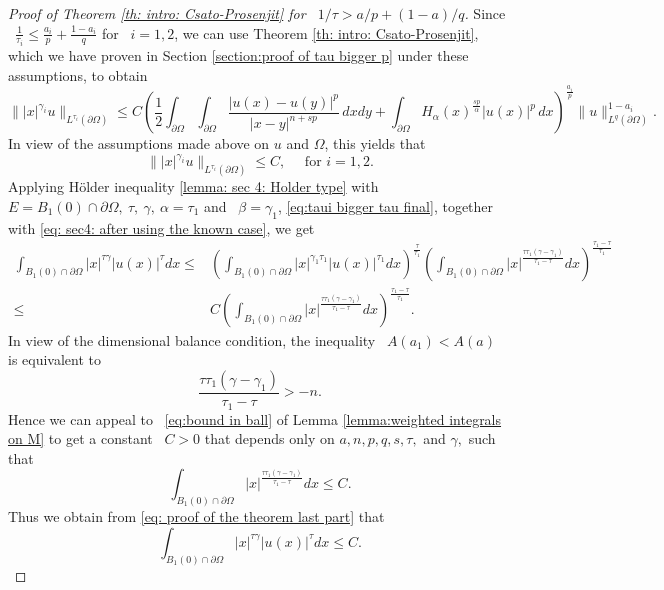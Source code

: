 \documentclass[reqno,12pt]{amsart}
\newcommand{\delomega}{\partial\Omega}
\numberwithin{equation}{section}
\theoremstyle{plain}
\theoremstyle{definition}
\renewcommand{\leq}{\leqslant}
\begin{document}
\begin{proof}[Proof of Theorem \ref{th: intro: Csato-Prosenjit} for ~$1/\tau>a/p+(1-a)/q$]
Since  ~$\frac{1}{\tau_i}\leq \frac{a_i}{p}+\frac{1-a_i}{q}$ for ~$i=1,2$,  we can use  Theorem \ref{th: intro: Csato-Prosenjit}, which we have proven in Section \ref{section:proof of tau bigger p} under these assumptions, to obtain 
\begin{equation*}
     \label{eq: sec4: Our Main result used}
     \||x|^{\gamma_i} u\|_{L^{\tau_i}(\delomega)}\leq C\left(\frac{1}{2}\int_{\delomega}\int_{\delomega} \frac{|u(x)-u(y)|^p}{|x-y|^{n+ s p}} \, dx dy +\int_{\delomega}H_{\alpha}(x)^{\frac{s p}{\alpha}} |u(x)|^p \, dx  \right)^{\frac{a_i}{p}} 
      \|u\|_{L^{q}(\delomega)}^{1-a_i}.
 \end{equation*}
 In view of the assumptions made above on $u$ and $\Omega$, this yields that 
 \begin{equation}
     \label{eq: sec4: after using the known case}
      \||x|^{\gamma_i} u\|_{L^{\tau_i}(\delomega)}\leq C, \quad\text{ for }  i=1,2.
 \end{equation}
 Applying  H\"older inequality \eqref{lemma: sec 4: Holder type} with ~$E={ B_1(0) \cap \partial\Omega}, ~\tau, ~\gamma,
 ~\alpha = \tau_1$ and ~$\beta = \gamma_1$, \eqref{eq:taui bigger tau final}, together with \eqref{eq: sec4: after using the known case},
 we get 
 \begin{equation}
     \label{eq: proof of the theorem last part}
     \begin{split} 
     \int_{ B_1(0) \cap \partial\Omega}|x|^{\tau\gamma}|u(x)|^\tau dx  
     \leq &     
     \left( \int_{ B_1(0) \cap \partial\Omega} |x|^{\gamma_1\tau_1}|u(x)|^{\tau_1} dx\right)^{\frac{\tau}{\tau_1}} \left( \int_{ B_1(0) \cap \partial\Omega}|x|^{\frac{\tau\tau_1(\gamma - \gamma_1)}{\tau_1 -\tau}}dx\right)^{\frac{\tau_1 -\tau}{\tau_1}}
      \\
     \leq & C\left( \int_{ B_1(0) \cap \partial\Omega}|x|^{\frac{\tau\tau_1(\gamma - \gamma_1)}{\tau_1 -\tau}}dx\right)^{\frac{\tau_1 -\tau}{\tau_1}}.
     \end{split}
 \end{equation}
 In view of the dimensional balance condition, the inequality ~$A(a_1)<A(a)$~ is equivalent to  
 $$
 \frac{\tau\tau_1(\gamma - \gamma_1)}{\tau_1 -\tau} >-n.
 $$
Hence we can appeal to  ~\eqref{eq:bound in ball} of Lemma \ref{lemma:weighted integrals on M} to get a constant ~$C >0$ that depends only on $a,n,p,q,s,\tau,$ and $ \gamma, $ such that 
 $$\int_{ B_1(0) \cap \partial\Omega}|x|^{\frac{\tau\tau_1(\gamma - \gamma_1)}{\tau_1 -\tau}}dx \leq C.$$
Thus we obtain from \eqref{eq: proof of the theorem last part} that
\begin{equation}
    \label{eq: proof of the theorem last part1} 
     \int_{ B_1(0) \cap \partial\Omega}|x|^{\tau\gamma}|u(x)|^\tau dx \leq C.
\end{equation}



\end{proof}
\end{document}
